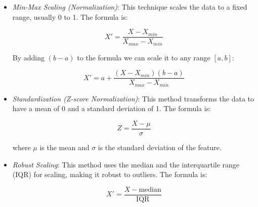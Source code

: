 \begin{itemize}
    
    \item \emph{Min-Max Scaling (Normalization)}: This technique scales the data to a fixed range, usually 0 to 1. The formula is:
    
    \[
        X' = \frac{X - X_{min}}{X_{max} - X_{min}}
    \]

    By adding \((b - a)\) to the formula we can scale it to any range \([a, b]\):

    \[
        X' = a + \frac{(X - X_{min})(b - a)}{X_{max} - X_{min}}
    \]

    \item \emph{Standardization (Z-score Normalization)}: This method transforms the data to have a mean of 0 and a standard deviation of 1. The formula is:
    
    \[
        Z = \frac{X - \mu}{\sigma}
    \]

    where \(\mu\) is the mean and \(\sigma\) is the standard deviation of the feature.

    \item \emph{Robust Scaling}: This method uses the median and the interquartile range (IQR) for scaling, making it robust to outliers. The formula is:
    
    \[
        X' = \frac{X - \text{median}}{\text{IQR}}
    \]

\end{itemize}